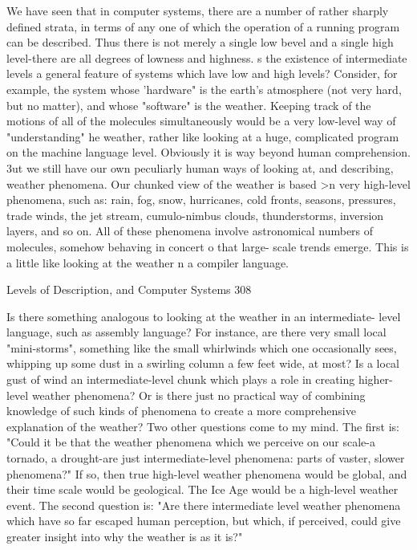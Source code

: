        We have seen that in computer systems, there are a number of rather sharply
       defined strata, in terms of any one of which the operation of a running program
       can be described. Thus there is not merely a single low bevel and a single high
       level-there are all degrees of lowness and highness. s the existence of intermediate
       levels a general feature of systems which lave low and high levels? Consider, for
       example, the system whose 'hardware" is the earth's atmosphere (not very hard,
       but no matter), and whose "software" is the weather. Keeping track of the motions
       of all of the molecules simultaneously would be a very low-level way of
       "understanding" he weather, rather like looking at a huge, complicated program
       on the machine language level. Obviously it is way beyond human
       comprehension. 3ut we still have our own peculiarly human ways of looking at,
       and describing, weather phenomena. Our chunked view of the weather is based >n
       very high-level phenomena, such as: rain, fog, snow, hurricanes, cold fronts,
       seasons, pressures, trade winds, the jet stream, cumulo-nimbus clouds,
       thunderstorms, inversion layers, and so on. All of these phenomena involve
       astronomical numbers of molecules, somehow behaving in concert o that large-
       scale trends emerge. This is a little like looking at the weather n a compiler
       language.




Levels of Description, and Computer Systems                                             308

               Is there something analogous to looking at the weather in an intermediate-
       level language, such as assembly language? For instance, are there very small
       local "mini-storms", something like the small whirlwinds which one occasionally
       sees, whipping up some dust in a swirling column a few feet wide, at most? Is a
       local gust of wind an intermediate-level chunk which plays a role in creating
       higher-level weather phenomena? Or is there just no practical way of combining
       knowledge of such kinds of phenomena to create a more comprehensive
       explanation of the weather?
               Two other questions come to my mind. The first is: "Could it be that the
       weather phenomena which we perceive on our scale-a tornado, a drought-are just
       intermediate-level phenomena: parts of vaster, slower phenomena?" If so, then
       true high-level weather phenomena would be global, and their time scale would
       be geological. The Ice Age would be a high-level weather event. The second
       question is: "Are there intermediate level weather phenomena which have so far
       escaped human perception, but which, if perceived, could give greater insight into
       why the weather is as it is?"

